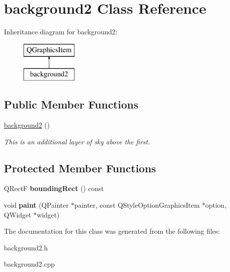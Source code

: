\hypertarget{classbackground2}{\section{background2 Class Reference}
\label{classbackground2}
}
Inheritance diagram for background2\-:\begin{figure}[H]
\begin{center}
\leavevmode
\includegraphics[height=2.000000cm]{classbackground2}
\end{center}
\end{figure}
\subsection*{Public Member Functions}
\begin{DoxyCompactItemize}
\item 
\hypertarget{classbackground2_a268ee2f21e35112e47a8dd6c287f82cb}{\hyperlink{classbackground2_a268ee2f21e35112e47a8dd6c287f82cb}{background2} ()}\label{classbackground2_a268ee2f21e35112e47a8dd6c287f82cb}

\begin{DoxyCompactList}\small\item\em This is an additional layer of sky above the first. \end{DoxyCompactList}\end{DoxyCompactItemize}
\subsection*{Protected Member Functions}
\begin{DoxyCompactItemize}
\item 
\hypertarget{classbackground2_a8d1e5049e4589879d20fbee704074c60}{Q\-Rect\-F {\bfseries bounding\-Rect} () const }\label{classbackground2_a8d1e5049e4589879d20fbee704074c60}

\item 
\hypertarget{classbackground2_ae9c85e5b171bb6ead3497e8e535d120f}{void {\bfseries paint} (Q\-Painter $\ast$painter, const Q\-Style\-Option\-Graphics\-Item $\ast$option, Q\-Widget $\ast$widget)}\label{classbackground2_ae9c85e5b171bb6ead3497e8e535d120f}

\end{DoxyCompactItemize}


The documentation for this class was generated from the following files\-:\begin{DoxyCompactItemize}
\item 
background2.\-h\item 
background2.\-cpp\end{DoxyCompactItemize}
